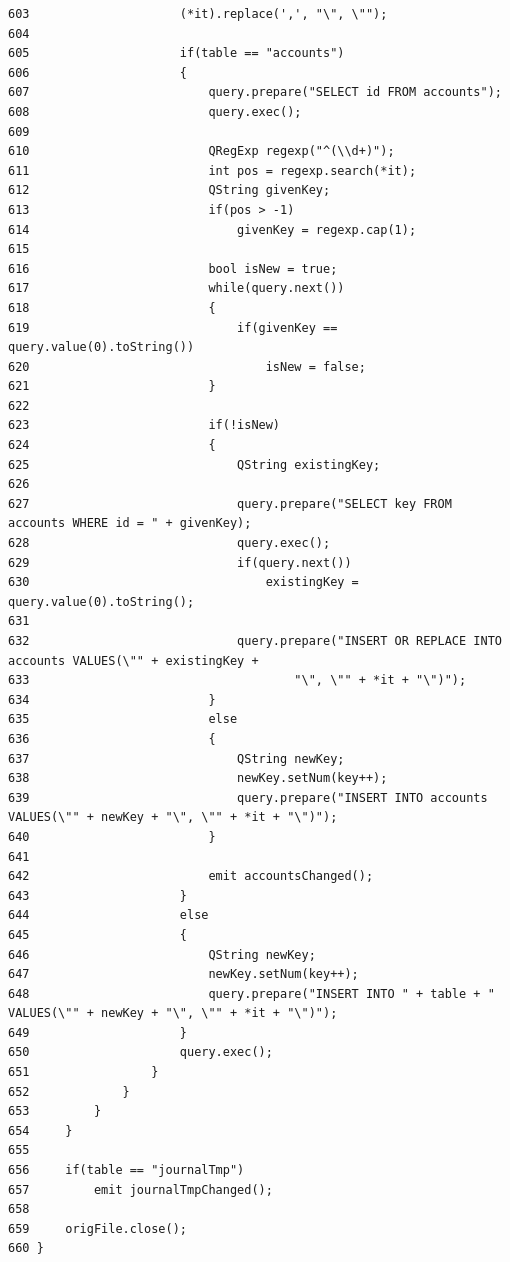 \begin{verbatim}
603                     (*it).replace(',', "\", \"");
604                     
605                     if(table == "accounts")
606                     {
607                         query.prepare("SELECT id FROM accounts");
608                         query.exec();
609                         
610                         QRegExp regexp("^(\\d+)");
611                         int pos = regexp.search(*it);
612                         QString givenKey;
613                         if(pos > -1)
614                             givenKey = regexp.cap(1);
615                         
616                         bool isNew = true;
617                         while(query.next())
618                         {
619                             if(givenKey == query.value(0).toString())
620                                 isNew = false;
621                         }
622                         
623                         if(!isNew)
624                         {
625                             QString existingKey;
626                             
627                             query.prepare("SELECT key FROM accounts WHERE id = " + givenKey);
628                             query.exec();
629                             if(query.next())
630                                 existingKey = query.value(0).toString();
631                             
632                             query.prepare("INSERT OR REPLACE INTO accounts VALUES(\"" + existingKey +
633                                     "\", \"" + *it + "\")");
634                         }
635                         else
636                         {
637                             QString newKey;
638                             newKey.setNum(key++);
639                             query.prepare("INSERT INTO accounts VALUES(\"" + newKey + "\", \"" + *it + "\")");
640                         }
641 
642                         emit accountsChanged();
643                     }
644                     else
645                     {
646                         QString newKey;
647                         newKey.setNum(key++);
648                         query.prepare("INSERT INTO " + table + " VALUES(\"" + newKey + "\", \"" + *it + "\")");
649                     }
650                     query.exec();
651                 }
652             }
653         }
654     }
655 
656     if(table == "journalTmp")
657         emit journalTmpChanged();
658     
659     origFile.close();
660 }
\end{verbatim}\normalsize 


